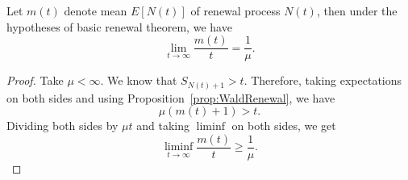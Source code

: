 \documentclass[a4paper,10pt]{article}
\begin{document}
\begin{thm} Let $m(t)$ denote mean $E[N(t)]$ of renewal process $N(t)$, then under the hypotheses of basic renewal theorem, we have 
\begin{equation*}
\lim_{t \to \infty}\frac{m(t)}{t} = \frac{1}{\mu}.
\end{equation*}
\end{thm}
\begin{proof}
Take $\mu < \infty$. We know that $S_{N(t)+1} > t$. Therefore, taking expectations on both sides and using Proposition~\ref{prop:WaldRenewal}, we have 
\begin{equation*}
\mu (m(t) + 1) > t.
\end{equation*}
Dividing both sides by $\mu t$ and taking $\liminf$ on both sides, we get
\begin{equation}
\label{eq:LiminfMean}
	\liminf_{t \to \infty} \frac{m(t)}{t} \geq \frac{1}{\mu}.
\end{equation}


\end{proof}
\end{document}
